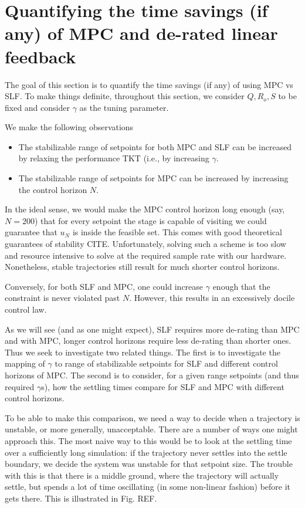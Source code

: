 \documentclass[journal,twocolumn,twoside]{IEEEtran}
\begin{document}
\section{Quantifying the time savings (if any) of MPC and de-rated linear feedback}
\label{sec:org7edf36d}
The goal of this section is to quantify the time savings (if any) of using MPC vs SLF. To make things definite, throughout this section, we consider $Q, R_o, S$ to be fixed and consider $\gamma$ as the tuning parameter.

We make the following observations
\begin{itemize}
\item The stabilizable range of setpoints for both MPC and SLF can be increased by relaxing the performance TKT (i.e., by increasing $\gamma$.
\item The stabilizable range of setpoints for MPC can be increased by increasing the control horizon $N$.
\end{itemize}

In the ideal sense, we would make the MPC control horizon long enough (say, $N=200$) that for every setpoint the stage is capable of visiting we could guarantee that $u_N$ is inside the feasible set. This comes with good theoretical guarantees of stability CITE. Unfortunately, solving such a scheme is too slow and resource intensive to solve at the required sample rate with our hardware. Nonetheless, stable trajectories still result for much shorter control horizons. 

Conversely, for both SLF and MPC, one could increase $\gamma$ enough that the constraint is never violated past $N$. However, this results in an excessively docile control law.

As we will see (and as one might expect), SLF requires more de-rating than MPC and with MPC, longer control horizons require less de-rating than shorter ones. Thus we seek to investigate two related things. The first is to investigate the mapping of $\gamma$ to range of stabilizable setpoints for SLF and different control horizons of MPC. The second is to consider, for a given range setpoints (and thus required $\gamma$s), how the settling times compare for SLF and MPC with different control horizons.

To be able to make this comparison, we need a way to decide when a trajectory is unstable, or more generally, unacceptable. There are a number of ways one might approach this. The most naive way to this would be to look at the settling time over a sufficiently long simulation: if the trajectory never settles into the settle boundary, we decide the system was unstable for that setpoint size. The trouble with this is that there is a middle ground, where the trajectory will actually settle, but spends a lot of time oscillating (in some non-linear fashion) before it gets there. This is illustrated in Fig. REF. 
\end{document}
